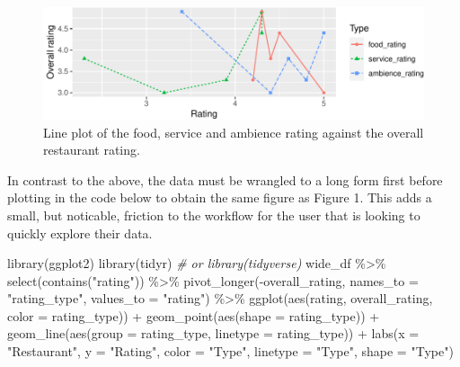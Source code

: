 \documentclass[10pt,a4paper,onecolumn]{article}
\newenvironment{Shaded}{\begin{snugshade}}{\end{snugshade}}
\newcommand{\AttributeTok}[1]{\textcolor[rgb]{0.77,0.63,0.00}{#1}}
\newcommand{\CommentTok}[1]{\textcolor[rgb]{0.56,0.35,0.01}{\textit{#1}}}
\newcommand{\FunctionTok}[1]{\textcolor[rgb]{0.00,0.00,0.00}{#1}}
\newcommand{\NormalTok}[1]{#1}
\newcommand{\SpecialCharTok}[1]{\textcolor[rgb]{0.00,0.00,0.00}{#1}}
\newcommand{\StringTok}[1]{\textcolor[rgb]{0.31,0.60,0.02}{#1}}
\begin{document}
\begin{figure}
\centering
\includegraphics{paper_files/figure-latex/matplot2-1.pdf}
\caption{Line plot of the food, service and ambience rating against the
overall restaurant rating.}
\end{figure}

In contrast to the above, the data must be wrangled to a long form first
before plotting in the code below to obtain the same figure as Figure 1.
This adds a small, but noticable, friction to the workflow for the user
that is looking to quickly explore their data.

\begin{Shaded}
\begin{Highlighting}[]
\FunctionTok{library}\NormalTok{(ggplot2)}
\FunctionTok{library}\NormalTok{(tidyr) }\CommentTok{\# or library(tidyverse)}
\NormalTok{wide\_df }\SpecialCharTok{\%\textgreater{}\%} 
  \FunctionTok{select}\NormalTok{(}\FunctionTok{contains}\NormalTok{(}\StringTok{"rating"}\NormalTok{)) }\SpecialCharTok{\%\textgreater{}\%} 
  \FunctionTok{pivot\_longer}\NormalTok{(}\SpecialCharTok{{-}}\NormalTok{overall\_rating, }
               \AttributeTok{names\_to =} \StringTok{"rating\_type"}\NormalTok{,}
               \AttributeTok{values\_to =} \StringTok{"rating"}\NormalTok{) }\SpecialCharTok{\%\textgreater{}\%} 
  \FunctionTok{ggplot}\NormalTok{(}\FunctionTok{aes}\NormalTok{(rating, overall\_rating, }\AttributeTok{color =}\NormalTok{ rating\_type)) }\SpecialCharTok{+} 
  \FunctionTok{geom\_point}\NormalTok{(}\FunctionTok{aes}\NormalTok{(}\AttributeTok{shape =}\NormalTok{ rating\_type)) }\SpecialCharTok{+}
  \FunctionTok{geom\_line}\NormalTok{(}\FunctionTok{aes}\NormalTok{(}\AttributeTok{group =}\NormalTok{ rating\_type, }\AttributeTok{linetype =}\NormalTok{ rating\_type)) }\SpecialCharTok{+}
  \FunctionTok{labs}\NormalTok{(}\AttributeTok{x =} \StringTok{"Restaurant"}\NormalTok{, }\AttributeTok{y =} \StringTok{"Rating"}\NormalTok{, }
       \AttributeTok{color =} \StringTok{"Type"}\NormalTok{, }\AttributeTok{linetype =} \StringTok{"Type"}\NormalTok{, }\AttributeTok{shape =} \StringTok{"Type"}\NormalTok{)}
\end{Highlighting}
\end{Shaded}
\end{document}
